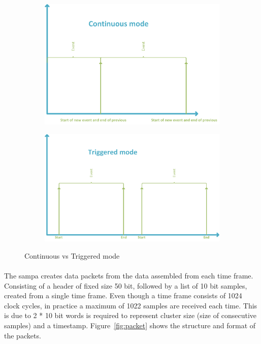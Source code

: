 \documentclass[a4paper]{report}
\begin{document}
{\begin{figure}[t!]
	\label{fig:cont-vs-trig}
	\centering
		\begin{subfigure}[]{0.9\textwidth}
			\label{fig:cont}
			\includegraphics[width=\textwidth]{images/cont-mode.png}
		\end{subfigure}
		\begin{subfigure}[]{0.9\textwidth}
			\label{fig:trig}
			\includegraphics[width=\textwidth]{images/triggered-mode.png}
		\end{subfigure}
	\caption{Continuous vs Triggered mode}
\end{figure}

\paragraph{}
The \gls{sampa} creates data packets from the data assembled from each time frame.
Consisting of a header of fixed size 50 bit, followed by a list of 10 bit samples, created from a single time frame.
Even though a time frame consists of 1024 clock cycles, in practice a maximum of 1022 samples are received each time.
This is due to 2 * 10 bit words is required to represent cluster size (size of consecutive samples) and a timestamp.
Figure~\ref{fig:packet} shows the structure and format of the packets.

}
\end{document}
